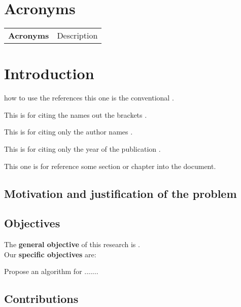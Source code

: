 \documentclass[letterpaper, twoside, openright, 12pt]{book}%
\begin{document}
\tableofcontents
\setcounter{tocdepth}{2}
\listoffigures
{}
\listoftables
{}

\chapter*{Acronyms} 
\begin{longtable}{>{\bfseries}p{3cm}p{11cm}}
Acronyms & Description \\

\end{longtable}

\mainmatter


\chapter{Introduction} \label{chap:Introduction}
how to use the references this one is the conventional \citep{Loyola2016}.

This is for citing the names out the brackets \cite{Loyola2016}.

This is for citing only the author names \citeauthor{Loyola2016}.

This is for citing only the year of the publication \citeyear{Loyola2016}.

This one is for reference some section  or chapter  into the document. 


\section{Motivation and justification of the problem}

\section{Objectives}
The \textbf{general objective} of this research is .\\

Our \textbf{specific objectives} are:

\begin{enumerate}[1.]
{
 \item Propose an algorithm for .......
}
\end{enumerate}

\section{Contributions}
\end{document}

